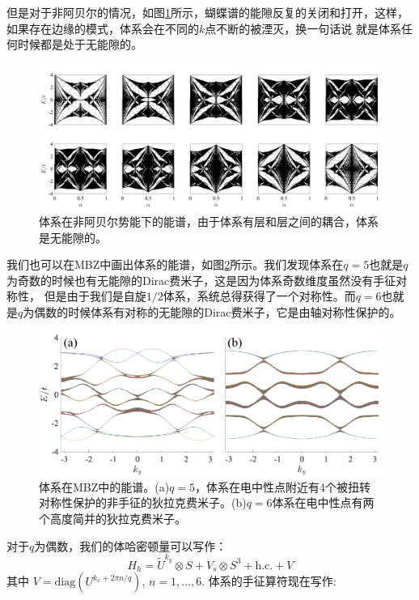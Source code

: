 \documentclass[supercite]{HustGraduPaper}
\begin{document}
但是对于非阿贝尔的情况，如图\ref{fig:sp5}所示，蝴蝶谱的能隙反复的关闭和打开，这样，如果存在边缘的模式，体系会在不同的$k$点不断的被湮灭，换一句话说
就是体系任何时候都是处于无能隙的。


\begin{figure}
	\centering
	\includegraphics[width=1\linewidth]{Figures/topoinsu/SP5}
	\caption{体系在非阿贝尔势能下的能谱，由于体系有层和层之间的耦合，体系是无能隙的。}
	\label{fig:sp5}
\end{figure}
我们也可以在MBZ中画出体系的能谱，如图\ref{fig:sband}所示。我们发现体系在$q = 5$也就是$q$为奇数的时候也有无能隙的Dirac费米子，这是因为体系奇数维度虽然没有手征对称性，
但是由于我们是自旋$1/2$体系，系统总得获得了一个对称性。而$q=6$也就是$q$为偶数的时候体系有对称的无能隙的Dirac费米子，它是由轴对称性保护的。
\begin{figure}
	\centering
	\includegraphics[width=1\linewidth]{Figures/topoinsu/S_band}
	\caption{体系在MBZ中的能谱。(a)$q = 5$，体系在电中性点附近有4个被扭转对称性保护的非手征的狄拉克费米子。(b)$q=6$体系在电中性点有两个高度简并的狄拉克费米子。}
	\label{fig:sband}
\end{figure}
对于$q$为偶数，我们的体哈密顿量可以写作：
\begin{equation}
H_h = \tilde{U}^{k_y} \otimes S +  V_s \otimes S^3 + \text{h.c.}+V
\end{equation}
其中 $V = \text{diag}(U^{k_x + 2\pi n/q})$, $n = 1,...,6$. 
体系的手征算符现在写作:
\end{document}

